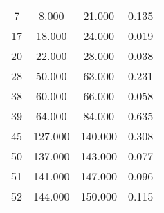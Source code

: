 % 
\begin{tabular}{cccc}
  \hline
  \hline
7 & 8.000 & 21.000 & 0.135 \\ 
  17 & 18.000 & 24.000 & 0.019 \\ 
  20 & 22.000 & 28.000 & 0.038 \\ 
  28 & 50.000 & 63.000 & 0.231 \\ 
  38 & 60.000 & 66.000 & 0.058 \\ 
  39 & 64.000 & 84.000 & 0.635 \\ 
  45 & 127.000 & 140.000 & 0.308 \\ 
  50 & 137.000 & 143.000 & 0.077 \\ 
  51 & 141.000 & 147.000 & 0.096 \\ 
  52 & 144.000 & 150.000 & 0.115 \\ 
   \hline
\end{tabular}
